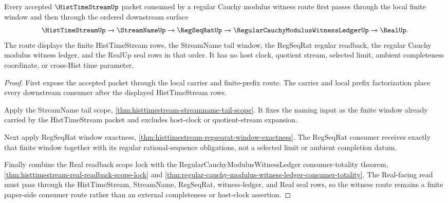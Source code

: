 \begin{theorem}
\label{thm:histtimestream-regular-witness-ledger-route}
Every accepted $\HistTimeStreamUp$ packet consumed by a regular Cauchy modulus witness route first passes through the local finite window and then through the ordered downstream surface
$$
\HistTimeStreamUp \to \StreamNameUp \to \RegSeqRatUp \to \RegularCauchyModulusWitnessLedgerUp \to \RealUp .
$$
The route displays the finite HistTimeStream rows, the StreamName tail window, the RegSeqRat regular readback, the regular Cauchy modulus witness ledger, and the RealUp seal rows in that order. It has no host clock, quotient stream, selected limit, ambient completeness coordinate, or cross-Hist time parameter.
\end{theorem}
\begin{proof}
First expose the accepted packet through the local carrier and finite-prefix route. The carrier and local prefix factorization place every downstream consumer after the displayed HistTimeStream rows.

Apply the StreamName tail scope, \autoref{thm:histtimestream-streamname-tail-scope}. It fixes the naming input as the finite window already carried by the HistTimeStream packet and excludes host-clock or quotient-stream expansion.

Next apply RegSeqRat window exactness, \autoref{thm:histtimestream-regseqrat-window-exactness}. The RegSeqRat consumer receives exactly that finite window together with its regular rational-sequence obligations, not a selected limit or ambient completion datum.

Finally combine the Real readback scope lock with the RegularCauchyModulusWitnessLedger consumer-totality theorem, \autoref{thm:histtimestream-real-readback-scope-lock} and \autoref{thm:regular-cauchy-modulus-witness-ledger-consumer-totality}. The Real-facing read must pass through the HistTimeStream, StreamName, RegSeqRat, witness-ledger, and Real seal rows, so the witness route remains a finite paper-side consumer route rather than an external completeness or host-clock assertion.
\end{proof}


